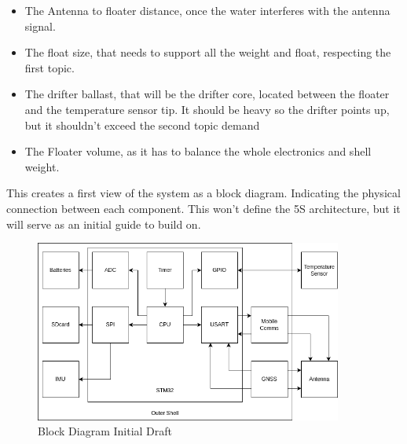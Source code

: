 \begin{itemize}
    \item The Antenna to floater distance, once the water interferes with the antenna signal.
    \item The float size, that needs to support all the weight and float, respecting the first topic.
    \item The drifter ballast, that will be the drifter core, located between the 
    floater and the temperature sensor tip. It should be heavy so the drifter points up, but it shouldn't exceed the 
    second topic demand 
    \item The Floater volume, as it has to balance the whole electronics and shell 
    weight.
\end{itemize}
This creates a first view of the system as a block diagram. Indicating the physical 
connection between each component. This won't define the 5S architecture, but it will serve
as an initial guide to build on.

\begin{figure}[H]
    \centering
    \includegraphics[width=0.9\textwidth]{images/diagrams/block_diagram/block_diagrams_3/blockdiagram_analysis.drawio.png}  %
    \caption{Block Diagram Initial Draft}
    \label{fig:Block Diagram Initial Draft}        
\end{figure}

